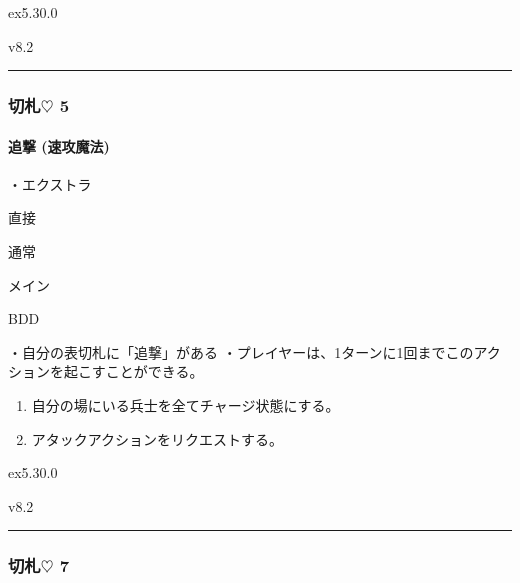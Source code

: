 \documentclass[letterpaper,10pt,dvipdfmx]{sphinxmanual}
\begin{document}
\sphinxAtStartPar
{}  ex5.30.0

\sphinxAtStartPar
{}  v8.2


\bigskip\hrule\bigskip



\subsubsection{切札{\normalsize $\heartsuit$} 5}
\label{\detokenize{auto/frameActionlist:id37}}

\paragraph{追撃 (速攻魔法)}
\label{\detokenize{auto/frameActionlist:act-pursuit}}\label{\detokenize{auto/frameActionlist:id38}}
\sphinxAtStartPar
{}

\sphinxAtStartPar
・エクストラ

\sphinxAtStartPar
{} 直接

\sphinxAtStartPar
{} 通常

\sphinxAtStartPar
{} メイン

\sphinxAtStartPar
{} BDD

\sphinxAtStartPar
{}

\sphinxAtStartPar
・自分の表切札に「追撃」がある
・プレイヤーは、1ターンに1回までこのアクションを起こすことができる。

\sphinxAtStartPar
{}
\begin{enumerate}
%
\item {} 
\sphinxAtStartPar
自分の場にいる兵士を全てチャージ状態にする。

\item {} 
\sphinxAtStartPar
アタックアクションをリクエストする。

\end{enumerate}

\sphinxAtStartPar
{}  ex5.30.0

\sphinxAtStartPar
{}  v8.2


\bigskip\hrule\bigskip



\subsubsection{切札{\normalsize $\heartsuit$} 7}
\label{\detokenize{auto/frameActionlist:id39}}
\end{document}
